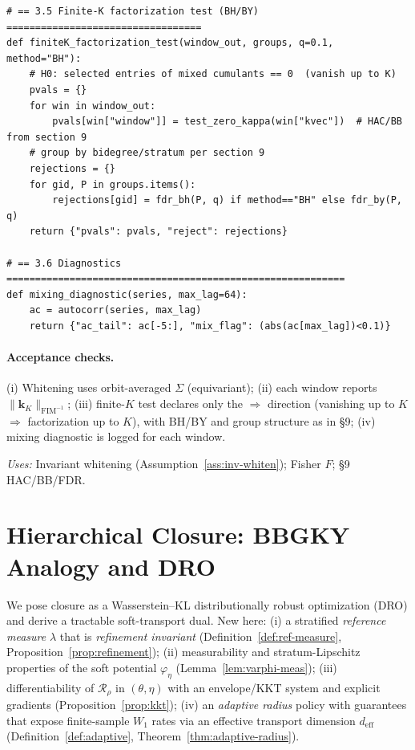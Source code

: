 \documentclass[10pt]{article}
\newcommand{\FIM}{\mathrm{FIM}}
\newcommand{\uses}[1]{\par\smallskip\noindent\textit{Uses: }#1\par\smallskip}
\begin{document}
\begin{lstlisting}
# == 3.5 Finite-K factorization test (BH/BY) ==================================
def finiteK_factorization_test(window_out, groups, q=0.1, method="BH"):
    # H0: selected entries of mixed cumulants == 0  (vanish up to K)
    pvals = {}
    for win in window_out:
        pvals[win["window"]] = test_zero_kappa(win["kvec"])  # HAC/BB from section 9
    # group by bidegree/stratum per section 9
    rejections = {}
    for gid, P in groups.items():
        rejections[gid] = fdr_bh(P, q) if method=="BH" else fdr_by(P, q)
    return {"pvals": pvals, "reject": rejections}

# == 3.6 Diagnostics ===========================================================
def mixing_diagnostic(series, max_lag=64):
    ac = autocorr(series, max_lag)
    return {"ac_tail": ac[-5:], "mix_flag": (abs(ac[max_lag])<0.1)}
\end{lstlisting}

\paragraph{Acceptance checks.}
(i) Whitening uses orbit-averaged $\Sigma$ (equivariant);  
(ii) each window reports $\|\widehat{\mathbf k}_K\|_{\FIM^{-1}}$;  
(iii) finite-$K$ test declares only the $\Rightarrow$ direction (vanishing up to $K$ $\Rightarrow$ factorization up to $K$), with BH/BY and group structure as in §9;  
(iv) mixing diagnostic is logged for each window.

\uses{Invariant whitening (Assumption~\ref{ass:inv-whiten}); Fisher $F$; §9 HAC/BB/FDR.}


\section{Hierarchical Closure: BBGKY Analogy and DRO}\label{sec:closure}

We pose closure as a Wasserstein--KL distributionally robust optimization (DRO) and derive a tractable soft-transport dual. New here:
(i) a stratified \emph{reference measure} $\lambda$ that is \emph{refinement invariant} (Definition~\ref{def:ref-measure}, Proposition~\ref{prop:refinement});
(ii) measurability and stratum-Lipschitz properties of the soft potential $\varphi_\eta$ (Lemma~\ref{lem:varphi-meas});
(iii) differentiability of $\mathcal R_\rho$ in $(\theta,\eta)$ with an envelope/KKT system and explicit gradients (Proposition~\ref{prop:kkt});
(iv) an \emph{adaptive radius} policy with guarantees that expose finite-sample $W_1$ rates via an effective transport dimension $d_{\mathrm{eff}}$ (Definition~\ref{def:adaptive}, Theorem~\ref{thm:adaptive-radius}).
\end{document}
